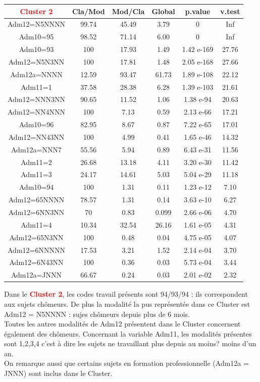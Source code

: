 \documentclass{book}
\begin{document}
\bigskip
\setlength\arrayrulewidth{2pt}
\begin{tabular}{|c||ccccc|}
\hline
 \textbf{\textcolor{red}{Cluster 2}}            &    Cla/Mod  &   Mod/Cla   &   Global   &    p.value  &   v.test  \\
\hline
\hline 
   
Adm12=N5NNNN  &99.74 &45.49 & 3.79 & 0   		&     Inf\\
Adm10=95      &98.52 &71.14 & 6.00 & 0  		&      Inf\\
Adm10=93      &100   &17.93 & 1.49 &1.42 e-169 	&27.76\\
Adm12=N5N3NN  &100   &17.81 & 1.48 &2.05 e-168  &27.66\\
Adm12a=NNNN   &12.59 &93.47 &61.73 &1.89 e-108  &22.12\\
Adm11=1       &37.58 &28.38 & 6.28 &1.39 e-103  &21.61\\
Adm12=NNN3NN  &90.65 &11.52 & 1.06 & 1.38 e-94  &20.63\\
Adm12=NN4NNN  & 100  &7.13 & 0.59 & 2.13 e-66  &17.21\\
Adm10=96      & 82.95 & 8.67 & 0.87 & 7.22 e-65  &17.01\\
Adm12=NN43NN& 100 & 4.99 & 0.41 & 1.65 e-46  &14.32\\
Adm12a=NNN7   &55.56 & 5.94 & 0.89 & 6.43 e-31  &11.56\\
Adm11=2       &26.68 &13.18 & 4.11 & 3.20 e-30  &11.42\\
Adm11=3       &24.17 &14.61 & 5.03  &5.04 e-29  &11.18\\
Adm10=94      &100 & 1.31 & 0.11  &1.23 e-12  & 7.10\\
Adm12=65NNNN  &78.57 & 1.31 & 0.14  &3.63 e-10  & 6.27\\
Adm12=6NN3NN  &70 & 0.83& 0.099  &2.66 e-06  & 4.70\\
Adm11=4       &10.34 & 32.54 &26.16  &1.61 e-05  & 4.31\\
Adm12=65N3NN  &100 & 0.48 & 0.04  &4.75 e-05  & 4.07\\
Adm12=6NNNNN & 17.53 & 3.21 & 1.52  &2.14 e-04  & 3.70\\
Adm12=6N43NN &100 & 0.36 & 0.03  &5.73 e-04  & 3.44\\
Adm12a=JNNN  & 66.67 & 0.24  &0.03  &2.01 e-02  & 2.32\\
\hline
\end{tabular}

\bigskip
\noindent
Dans le \textbf{\textcolor{red}{Cluster 2}}, les codes travail présents sont 94/93/94 : ils correspondent aux sujets chômeurs. De plus la modalité la pus représentée dans ce Cluster est Adm12 = N5NNNN : sujes chômeurs depuis plus de 6 mois.\\
Toutes les autres modalités de Adm12 présentent dans le Cluster concernent également des chômeurs.
Concernant la variable Adm11, les modalités présentes sont 1,2,3,4 c'est à dire les sujets ne travaillant plus depuis au moins? moins d'un an.\\
On remarque aussi que certains sujets en formation professionnelle (Adm12a = JNNN) sont inclus dans le Cluster.\\
\end{document}
